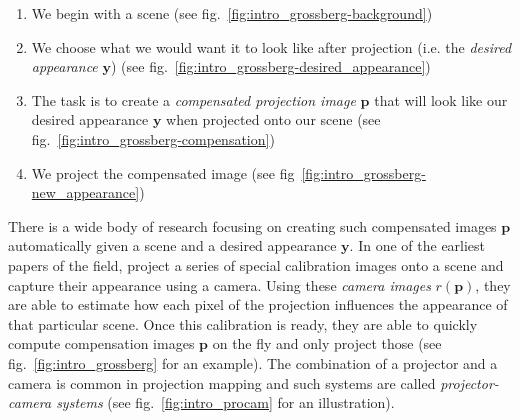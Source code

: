 \begin{enumerate}
    \item We begin with a scene (see fig.~\ref{fig:intro_grossberg-background})
    \item We choose what we would want it to look like after projection (i.e. the \textit{desired appearance} \(\bm{y}\)) (see fig.~\ref{fig:intro_grossberg-desired_appearance})
    \item The task is to create a \textit{compensated projection image} \(\bm{p}\) that will look like our desired appearance \(\bm{y}\) when projected onto our scene (see fig.~\ref{fig:intro_grossberg-compensation})
    \item We project the compensated image (see fig~\ref{fig:intro_grossberg-new_appearance})
\end{enumerate}

There is a wide body of research focusing on creating such compensated images \(\bm{p}\) automatically given a scene and a desired appearance \(\bm{y}\). In one of the earliest papers of the field, \citet{Grossberg2004} project a series of special calibration images onto a scene and capture their appearance using a camera. Using these \textit{camera images} \(r(\bm{p})\), they are able to estimate how each pixel of the projection influences the appearance of that particular scene. Once this calibration is ready, they are able to quickly compute compensation images \(\bm{p}\) on the fly and only project those (see fig.~\ref{fig:intro_grossberg} for an example). The combination of a projector and a camera is common in projection mapping and such systems are called \textit{projector-camera systems} (see fig.~\ref{fig:intro_procam} for an illustration).

